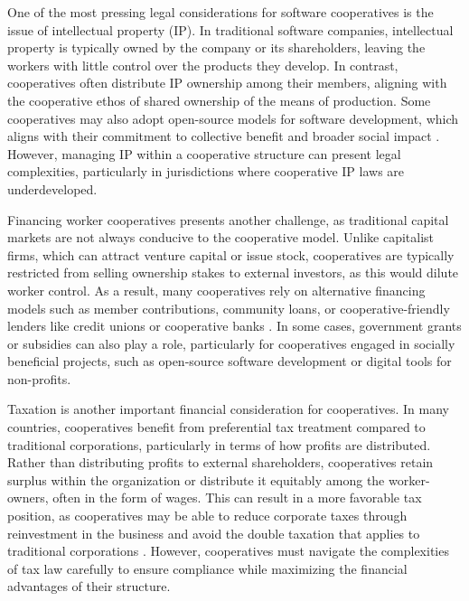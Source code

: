 \begin{refsection}
One of the most pressing legal considerations for software cooperatives is the issue of intellectual property (IP). In traditional software companies, intellectual property is typically owned by the company or its shareholders, leaving the workers with little control over the products they develop. In contrast, cooperatives often distribute IP ownership among their members, aligning with the cooperative ethos of shared ownership of the means of production. Some cooperatives may also adopt open-source models for software development, which aligns with their commitment to collective benefit and broader social impact \cite[pp.~115-118]{scholz2016}. However, managing IP within a cooperative structure can present legal complexities, particularly in jurisdictions where cooperative IP laws are underdeveloped.

Financing worker cooperatives presents another challenge, as traditional capital markets are not always conducive to the cooperative model. Unlike capitalist firms, which can attract venture capital or issue stock, cooperatives are typically restricted from selling ownership stakes to external investors, as this would dilute worker control. As a result, many cooperatives rely on alternative financing models such as member contributions, community loans, or cooperative-friendly lenders like credit unions or cooperative banks \cite[pp.~98-100]{restakis2012}. In some cases, government grants or subsidies can also play a role, particularly for cooperatives engaged in socially beneficial projects, such as open-source software development or digital tools for non-profits.

Taxation is another important financial consideration for cooperatives. In many countries, cooperatives benefit from preferential tax treatment compared to traditional corporations, particularly in terms of how profits are distributed. Rather than distributing profits to external shareholders, cooperatives retain surplus within the organization or distribute it equitably among the worker-owners, often in the form of wages. This can result in a more favorable tax position, as cooperatives may be able to reduce corporate taxes through reinvestment in the business and avoid the double taxation that applies to traditional corporations \cite[pp.~213-215]{zamagni2011}. However, cooperatives must navigate the complexities of tax law carefully to ensure compliance while maximizing the financial advantages of their structure.


\end{refsection}
